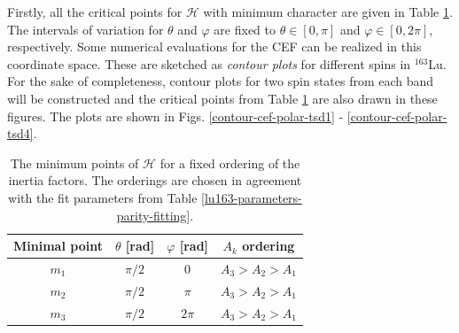 Firstly, all the critical points for $\mathcal{H}$ with minimum character are given in Table \ref{critical_points_h}. The intervals of variation for $\theta$ and $\varphi$ are fixed to $\theta\in[0,\pi]$ and $\varphi\in[0,2\pi]$, respectively. Some numerical evaluations for the CEF can be realized in this coordinate space. These are sketched as \emph{contour plots} for different spins in $^{163}$Lu. For the sake of completeness, contour plots for two spin states from each band will be constructed and the critical points from Table \ref{critical_points_h} are also drawn in these figures. The plots are shown in Figs. \ref{contour-cef-polar-tsd1} - \ref{contour-cef-polar-tsd4}.
\begin{table}
    \centering
    \begin{tabular}{cccc}
    \hline
    Minimal point & $\theta$ [rad] & $\varphi$ [rad] & $A_k$ ordering \\
    \hline
    \hline
    $m_1$ & $\pi/2$ &   $0$     &   $A_3>A_2>A_1$   \\
    $m_2$ & $\pi/2$ &   $\pi$   &   $A_3>A_2>A_1$   \\
    $m_3$ & $\pi/2$ &   $2\pi$  &   $A_3>A_2>A_1$   \\
    \hline
    \end{tabular}
    \caption{The minimum points of $\mathcal{H}$ for a fixed ordering of the inertia factors. The orderings are chosen in agreement with the fit parameters from Table \ref{lu163-parameters-parity-fitting}.}
    \label{critical_points_h}
\end{table}
